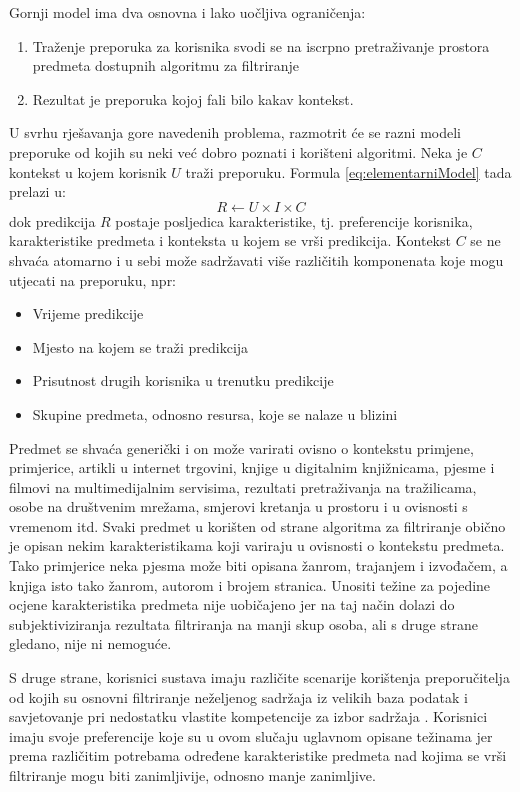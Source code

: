\documentclass[times, utf8, diplomski, numeric]{fer}
\begin{document}
Gornji model ima dva osnovna i lako uočljiva ograničenja:
\begin{enumerate}
  \item Traženje preporuka za korisnika svodi se na iscrpno pretraživanje
  prostora predmeta dostupnih algoritmu za filtriranje
  \item Rezultat je preporuka kojoj fali bilo kakav kontekst.
\end{enumerate}

U svrhu rješavanja gore navedenih problema, razmotrit će se razni modeli
preporuke od kojih su neki već dobro poznati i korišteni algoritmi. Neka je $C$
kontekst u kojem korisnik $U$ traži preporuku. Formula \ref{eq:elementarniModel}
tada prelazi u:
\begin{equation}
\label{eq:elementarniModelSKontekstom}
	R \leftarrow U \times I \times C
\end{equation}
dok predikcija $R$ postaje posljedica karakteristike, tj. preferencije
korisnika, karakteristike predmeta i konteksta u kojem se vrši predikcija.
Kontekst $C$ se ne shvaća atomarno i u sebi može sadržavati više različitih
komponenata koje mogu utjecati na preporuku, npr:
\begin{itemize}
  \item Vrijeme predikcije
  \item Mjesto na kojem se traži predikcija
  \item Prisutnost drugih korisnika u trenutku predikcije
  \item Skupine predmeta, odnosno resursa, koje se nalaze u blizini
\end{itemize}

Predmet se shvaća generički i on može varirati ovisno o kontekstu primjene,
primjerice, artikli u internet trgovini, knjige u digitalnim knjižnicama, pjesme
i filmovi na multimedijalnim servisima, rezultati pretraživanja na tražilicama,
osobe na društvenim mrežama, smjerovi kretanja u prostoru i u ovisnosti s
vremenom itd. Svaki predmet u korišten od strane algoritma za filtriranje obično
je opisan nekim karakteristikama koji variraju u ovisnosti o kontekstu predmeta.
Tako primjerice neka pjesma može biti opisana žanrom, trajanjem i izvođačem, a
knjiga isto tako žanrom, autorom i brojem stranica. Unositi težine za pojedine
ocjene karakteristika predmeta nije uobičajeno jer na taj način dolazi do
subjektiviziranja rezultata filtriranja na manji skup osoba, ali s druge strane
gledano, nije ni nemoguće.

S druge strane, korisnici sustava imaju različite scenarije korištenja
preporučitelja od kojih su osnovni filtriranje neželjenog sadržaja iz velikih
baza podatak i savjetovanje pri nedostatku vlastite kompetencije za izbor
sadržaja \cite{AskIda}. Korisnici imaju svoje preferencije koje su u ovom
slučaju uglavnom opisane težinama jer prema različitim potrebama određene
karakteristike predmeta nad kojima se vrši filtriranje mogu biti zanimljivije,
odnosno manje zanimljive.
\end{document}
